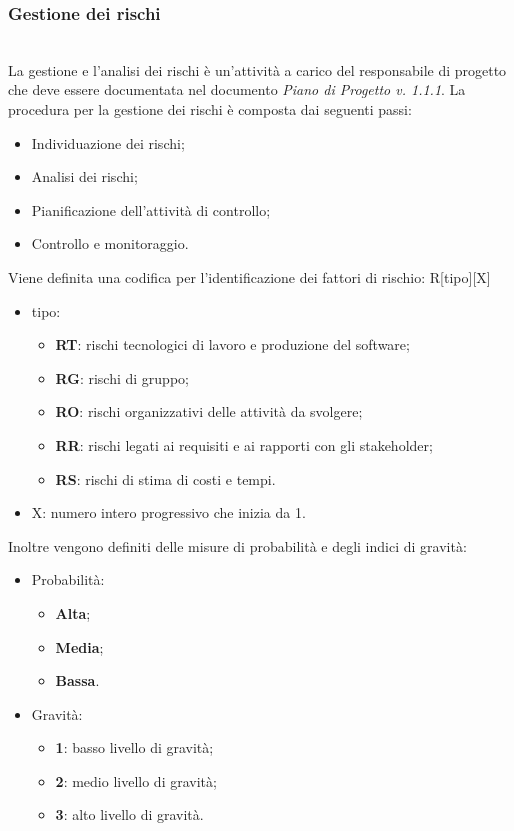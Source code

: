		\subsubsection{Gestione dei rischi}\mbox{}\\ [1mm]
			La gestione e l'analisi dei rischi è un'attività a carico del responsabile di progetto che deve essere documentata nel documento \textit{Piano di Progetto v. 1.1.1}.
			La procedura per la gestione dei rischi è composta dai seguenti passi:
			\begin{itemize}
				\item Individuazione dei rischi;
				\item Analisi dei rischi;
				\item Pianificazione dell'attività di controllo;
				\item Controllo e monitoraggio.
			\end{itemize}
			Viene definita una codifica per l'identificazione dei fattori di rischio: R[tipo][X]
			\begin{itemize}
				\item tipo:
				\begin{itemize}
					\item \textbf{RT}: rischi tecnologici di lavoro e produzione del software;
					\item \textbf{RG}: rischi di gruppo;
					\item \textbf{RO}: rischi organizzativi delle attività da svolgere;
					\item \textbf{RR}: rischi legati ai requisiti e ai rapporti con gli stakeholder;
					\item \textbf{RS}: rischi di stima di costi e tempi.
				\end{itemize}
				\item X: numero intero progressivo che inizia da 1.
			\end{itemize}
			Inoltre vengono definiti delle misure di probabilità e degli indici di gravità:
			\begin{itemize}
				\item Probabilità:
				\begin{itemize}
					\item \textbf{Alta};
					\item \textbf{Media};
					\item \textbf{Bassa}.
				\end{itemize}
				\item Gravità:
				\begin{itemize}
					\item \textbf{1}: basso livello di gravità;
					\item \textbf{2}: medio livello di gravità;
					\item \textbf{3}: alto livello di gravità.
				\end{itemize}
			\end{itemize}
